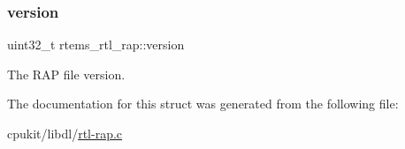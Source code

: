 \subsubsection{\texorpdfstring{version}{version}}
{\footnotesize\ttfamily uint32\+\_\+t rtems\+\_\+rtl\+\_\+rap\+::version}

The R\+AP file version. 

The documentation for this struct was generated from the following file\+:\begin{DoxyCompactItemize}
\item 
cpukit/libdl/\mbox{\hyperlink{rtl-rap_8c}{rtl-\/rap.\+c}}\end{DoxyCompactItemize}
